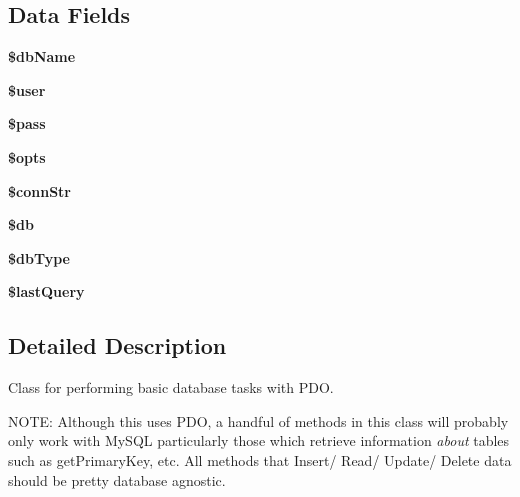 \subsection*{Data Fields}
\begin{DoxyCompactItemize}
\item 
\hypertarget{classdb_p_d_o_a68f39949e76b64662a06cb56579d91c3}{{\bfseries \$db\-Name}}\label{classdb_p_d_o_a68f39949e76b64662a06cb56579d91c3}

\item 
\hypertarget{classdb_p_d_o_a598ca4e71b15a1313ec95f0df1027ca5}{{\bfseries \$user}}\label{classdb_p_d_o_a598ca4e71b15a1313ec95f0df1027ca5}

\item 
\hypertarget{classdb_p_d_o_a12ec2780b52bd1c54d38c2f981c0349f}{{\bfseries \$pass}}\label{classdb_p_d_o_a12ec2780b52bd1c54d38c2f981c0349f}

\item 
\hypertarget{classdb_p_d_o_a2fce6a9b8be45967a21c53a89d006eaf}{{\bfseries \$opts}}\label{classdb_p_d_o_a2fce6a9b8be45967a21c53a89d006eaf}

\item 
\hypertarget{classdb_p_d_o_ab21baaff54912c674f85ae3221aa83cd}{{\bfseries \$conn\-Str}}\label{classdb_p_d_o_ab21baaff54912c674f85ae3221aa83cd}

\item 
\hypertarget{classdb_p_d_o_a1fa3127fc82f96b1436d871ef02be319}{{\bfseries \$db}}\label{classdb_p_d_o_a1fa3127fc82f96b1436d871ef02be319}

\item 
\hypertarget{classdb_p_d_o_a63b68daf124fa00e6bcfce64fabbdbe1}{{\bfseries \$db\-Type}}\label{classdb_p_d_o_a63b68daf124fa00e6bcfce64fabbdbe1}

\item 
\hypertarget{classdb_p_d_o_aeca28083f6c3846a0a4dd1681a75c76e}{{\bfseries \$last\-Query}}\label{classdb_p_d_o_aeca28083f6c3846a0a4dd1681a75c76e}

\end{DoxyCompactItemize}


\subsection{Detailed Description}
Class for performing basic database tasks with P\-D\-O.

N\-O\-T\-E\-: Although this uses P\-D\-O, a handful of methods in this class will probably only work with My\-S\-Q\-L particularly those which retrieve information {\itshape about} tables such as get\-Primary\-Key, etc. All methods that Insert/ Read/ Update/ Delete data should be pretty database agnostic.

